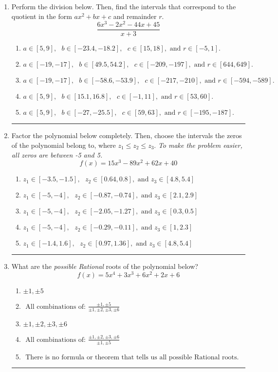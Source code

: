 \documentclass[14pt]{extbook}
\newcommand{\litem}[1]{\item#1\hspace*{-1cm}\rule{\textwidth}{0.4pt}}
\begin{document}
\begin{enumerate}
{\begin{enumerate}[label=\Alph*.]
\end{enumerate} }
\litem{
Perform the division below. Then, find the intervals that correspond to the quotient in the form $ax^2+bx+c$ and remainder $r$.\[ \frac{6x^{3} -2 x^{2} -44 x + 45}{x + 3} \]\begin{enumerate}[label=\Alph*.]
\item \( a \in [5, 9], \text{   } b \in [-23.4, -18.2], \text{   } c \in [15, 18], \text{   and   } r \in [-5, 1]. \)
\item \( a \in [-19, -17], \text{   } b \in [49.5, 54.2], \text{   } c \in [-209, -197], \text{   and   } r \in [644, 649]. \)
\item \( a \in [-19, -17], \text{   } b \in [-58.6, -53.9], \text{   } c \in [-217, -210], \text{   and   } r \in [-594, -589]. \)
\item \( a \in [5, 9], \text{   } b \in [15.1, 16.8], \text{   } c \in [-1, 11], \text{   and   } r \in [53, 60]. \)
\item \( a \in [5, 9], \text{   } b \in [-27, -25.5], \text{   } c \in [59, 63], \text{   and   } r \in [-195, -187]. \)

\end{enumerate} }
\litem{
Factor the polynomial below completely. Then, choose the intervals the zeros of the polynomial belong to, where $z_1 \leq z_2 \leq z_3$. \textit{To make the problem easier, all zeros are between -5 and 5.}\[ f(x) = 15x^{3} -89 x^{2} +62 x + 40 \]\begin{enumerate}[label=\Alph*.]
\item \( z_1 \in [-3.5, -1.5], \text{   }  z_2 \in [0.64, 0.8], \text{   and   } z_3 \in [4.8, 5.4] \)
\item \( z_1 \in [-5, -4], \text{   }  z_2 \in [-0.87, -0.74], \text{   and   } z_3 \in [2.1, 2.9] \)
\item \( z_1 \in [-5, -4], \text{   }  z_2 \in [-2.05, -1.27], \text{   and   } z_3 \in [0.3, 0.5] \)
\item \( z_1 \in [-5, -4], \text{   }  z_2 \in [-0.29, -0.11], \text{   and   } z_3 \in [1, 2.3] \)
\item \( z_1 \in [-1.4, 1.6], \text{   }  z_2 \in [0.97, 1.36], \text{   and   } z_3 \in [4.8, 5.4] \)

\end{enumerate} }
\litem{
What are the \textit{possible Rational} roots of the polynomial below?\[ f(x) = 5x^{4} +3 x^{3} +6 x^{2} +2 x + 6 \]\begin{enumerate}[label=\Alph*.]
\item \( \pm 1,\pm 5 \)
\item \( \text{ All combinations of: }\frac{\pm 1,\pm 5}{\pm 1,\pm 2,\pm 3,\pm 6} \)
\item \( \pm 1,\pm 2,\pm 3,\pm 6 \)
\item \( \text{ All combinations of: }\frac{\pm 1,\pm 2,\pm 3,\pm 6}{\pm 1,\pm 5} \)
\item \( \text{ There is no formula or theorem that tells us all possible Rational roots.} \)


\end{enumerate}}
\end{enumerate}
\end{document}
